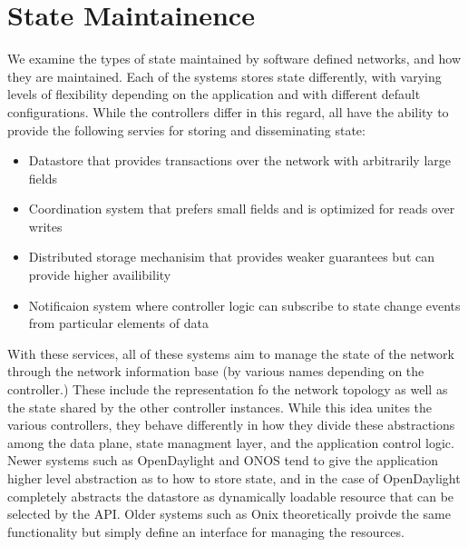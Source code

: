 \documentclass[letterpaper,twocolumn,10pt]{article}
\begin{document}
% 
% 
% 
% 



\section{State Maintainence}

We examine the types of state maintained by software defined networks, and how they are maintained. Each of the systems stores state differently, with varying levels of flexibility depending on the application and with different default configurations. While the controllers differ in this regard, all have the ability to provide the following servies for storing and disseminating state:

\begin{itemize}
\item Datastore that provides transactions over the network with arbitrarily large fields
\item Coordination system that prefers small fields and is optimized for reads over writes
\item Distributed storage mechanisim that provides weaker guarantees but can provide higher availibility
\item Notificaion system where controller logic can subscribe to state change events from particular elements of data
\end{itemize}

With these services, all of these systems aim to manage the state of the network through the network information base (by various names depending on the controller.) These include the representation fo the network topology as well as the state shared by the other controller instances. While this idea unites the various controllers, they behave differently in how they divide these abstractions among the data plane, state managment layer, and the application control
logic. Newer systems such as OpenDaylight and ONOS tend to give the application higher level abstraction as to how to store state, and in the case of OpenDaylight completely abstracts the datastore as dynamically loadable resource that can be selected by the API. Older systems such as Onix theoretically proivde the same functionality but simply define an interface for managing the resources. 
\end{document}
